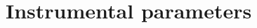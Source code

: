 \documentclass[twocolumn]{../../common/aa}
\def\WMAP{\emph{WMAP}}
\newcommand{\BP}{\textsc{BeyondPlanck}}
\begin{document}













\section{Instrumental parameters}
\label{sec:instrument}
\end{document}
